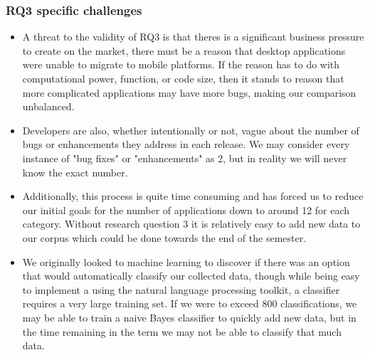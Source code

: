 \documentclass{acm_proc_article-sp}
\begin{document}
\subsubsection{RQ3 specific challenges}
\begin{itemize}


\item A threat to the validity of RQ3 is that theres is a significant business pressure to create \sibs on the market, there must be a reason that desktop applications were unable to migrate to mobile platforms. 
If the reason has to do with computational power, function, or code size, then it stands to reason that more complicated applications may have more bugs, making our comparison unbalanced.

\item Developers are also, whether intentionally or not, vague about the number of bugs or enhancements they address in each release. 
We may consider every instance of "bug fixes" or "enhancements" as 2, but in reality we will never know the exact number.

\item Additionally, this process is quite time consuming and has forced us to reduce our initial goals for the number of applications down to around 12 for each category.
Without research question 3 it is relatively easy to add new data to our corpus which could be done towards the end of the semester.

\item We originally looked to machine learning to discover if there was an option that would automatically classify our collected data, though while being easy to implement a using the natural language processing toolkit, a classifier requires a very large training set.
If we were to exceed 800 classifications, we may be able to train a naive Bayes classifier to quickly add new data, but in the time remaining in the term we may not be able to classify that much data.

\end{itemize}





\begin{center}

\label{tab:enhancements}
\end{center}

\begin{center}

\label{tab:sumenhance}
\end{center}
\end{document}
